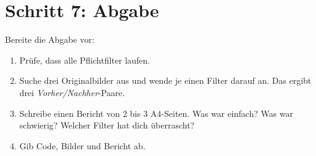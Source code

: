 
\section{Schritt 7: Abgabe}

Bereite die Abgabe vor:

\begin{enumerate}
  \item Pr\"ufe, dass alle Pflichtfilter laufen.
  \item Suche drei Originalbilder aus und wende je einen Filter darauf an.
    Das ergibt drei \textit{Vorher/Nachher}-Paare.
  \item Schreibe einen Bericht von 2 bis 3 A4-Seiten. Was
    war einfach? Was war schwierig? Welcher Filter hat dich \"uberrascht?
  \item Gib Code, Bilder und Bericht ab.
\end{enumerate}


\closechapter

